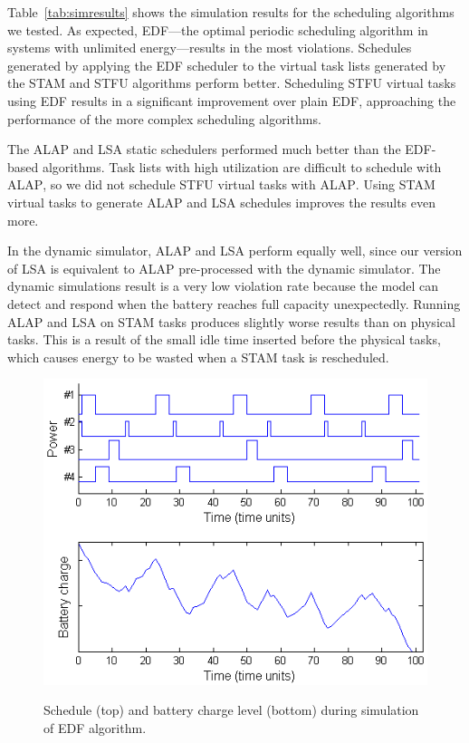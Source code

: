 Table~\ref{tab:simresults} shows the simulation results for the scheduling algorithms we tested.  As expected, \textsc{EDF}---the optimal periodic scheduling algorithm in systems with unlimited energy---results in the most violations.  Schedules generated by applying the \textsc{EDF} scheduler to the virtual task lists generated by the \textsc{STAM} and \textsc{STFU} algorithms perform better.  Scheduling \textsc{STFU} virtual tasks using \textsc{EDF} results in a significant improvement over plain \textsc{EDF}, approaching the performance of the more complex scheduling algorithms.

The \textsc{ALAP} and \textsc{LSA} static schedulers performed much better than the \textsc{EDF}-based algorithms.  Task lists with high utilization are difficult to schedule with \textsc{ALAP}, so we did not schedule \textsc{STFU} virtual tasks with \textsc{ALAP}.  Using \textsc{STAM} virtual tasks to generate \textsc{ALAP} and \textsc{LSA} schedules improves the results even more.

In the dynamic simulator, \textsc{ALAP} and \textsc{LSA} perform equally well, since our version of \textsc{LSA} is equivalent to \textsc{ALAP} pre-processed with the dynamic simulator.  The dynamic simulations result is a very low violation rate because the model can detect and respond when the battery reaches full capacity unexpectedly.  Running \textsc{ALAP} and \textsc{LSA} on \textsc{STAM} tasks produces slightly worse results than on physical tasks.  This is a result of the small idle time inserted before the physical tasks, which causes energy to be wasted when a \textsc{STAM} task is rescheduled.

\begin{figure}[tb]
\begin{center}
\includegraphics[scale=0.57]{edfbattery.png}
\label{fig:edfbattery}
\caption{Schedule (top) and battery charge level (bottom) during simulation of EDF algorithm.}
\end{center}
\end{figure}

